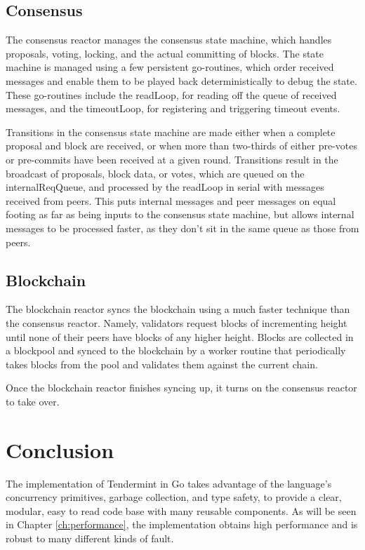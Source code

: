 \subsection{Consensus}

The consensus reactor manages the consensus state machine, which handles proposals, voting, locking, 
and the actual committing of blocks.
The state machine is managed using a few persistent go-routines, 
which order received messages and enable them to be played back deterministically to debug the state.
These go-routines include the readLoop, for reading off the queue of received messages, 
and the timeoutLoop, for registering and triggering timeout events. 

Transitions in the consensus state machine are made either when a complete proposal and block are received,
or when more than two-thirds of either pre-votes or pre-commits have been received at a given round.
Transitions result in the broadcast of proposals, block data, or votes, which are queued on the internalReqQueue,
and processed by the readLoop in serial with messages received from peers.
This puts internal messages and peer messages on equal footing as far as being inputs to the consensus state machine, 
but allows internal messages to be processed faster, as they don't sit in the same queue as those from peers.

\subsection{Blockchain}

The blockchain reactor syncs the blockchain using a much faster technique than the consensus reactor.
Namely, validators request blocks of incrementing height until none of their peers have blocks of any higher height.
Blocks are collected in a blockpool and synced to the blockchain by a worker routine that periodically takes blocks from the pool
and validates them against the current chain.

Once the blockchain reactor finishes syncing up, it turns on the consensus reactor to take over.

\section{Conclusion}

The implementation of Tendermint in Go takes advantage of the language's concurrency primitives, garbage collection, 
and type safety, to provide a clear, modular, easy to read code base with many reusable components. 
As will be seen in Chapter \ref{ch:performance}, the implementation obtains high performance and is robust to many different kinds of fault.
